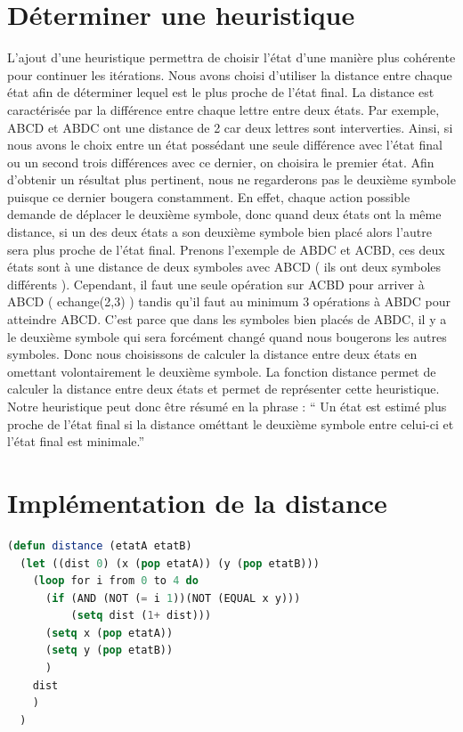 \documentclass[a4paper,10pt]{report}
\begin{document}
  \section{Déterminer une heuristique}
  L’ajout d’une heuristique permettra de choisir l’état d’une manière plus cohérente pour continuer les itérations. Nous avons choisi d’utiliser la distance entre chaque état afin de déterminer lequel est le plus proche de l’état final. La distance est caractérisée par la différence entre chaque lettre entre deux états. Par exemple, ABCD et ABDC ont une distance de 2 car deux lettres sont interverties. 
Ainsi, si nous avons le choix entre un état possédant une seule différence avec l’état final ou un second trois différences avec ce dernier, on choisira le premier état.
Afin d’obtenir un résultat plus pertinent, nous ne regarderons pas le deuxième symbole puisque ce dernier bougera constamment.\newline
En effet, chaque action possible demande de déplacer le deuxième symbole, donc quand deux états ont la même distance, si un des deux états a son deuxième symbole bien placé
alors l'autre sera plus proche de l'état final.\newline
Prenons l'exemple de ABDC et ACBD, ces deux états sont à une distance de deux symboles avec ABCD ( ils ont deux symboles différents ). Cependant, il faut une seule opération
sur ACBD pour arriver à ABCD ( echange(2,3) ) tandis qu'il faut au minimum 3 opérations à ABDC pour atteindre ABCD. C'est parce que dans les symboles bien placés de 
ABDC, il y a le deuxième symbole qui sera forcément changé quand nous bougerons les autres symboles.\newline
Donc nous choisissons de calculer la distance entre deux états en omettant volontairement le deuxième symbole.
La fonction distance permet de calculer la distance entre deux états et permet de représenter cette heuristique.
Notre heuristique peut donc être résumé en la phrase :
`` Un état est estimé plus proche de l'état final si la distance ométtant le deuxième symbole entre celui-ci et l'état final est minimale.''\newpage 
  \section{Implémentation de la distance}

  \begin{lstlisting}[language=Lisp]
   (defun distance (etatA etatB)
  (let ((dist 0) (x (pop etatA)) (y (pop etatB)))
    (loop for i from 0 to 4 do
	  (if (AND (NOT (= i 1))(NOT (EQUAL x y)))
	      (setq dist (1+ dist)))
	  (setq x (pop etatA))
	  (setq y (pop etatB))
	  )
    dist
    )
  )
  \end{lstlisting}
\end{document}
